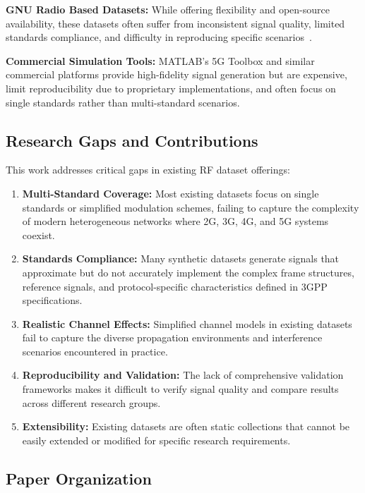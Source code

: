 \documentclass[conference]{IEEEtran}
\begin{document}
\textbf{GNU Radio Based Datasets:} While offering flexibility and open-source availability, these datasets often suffer from inconsistent signal quality, limited standards compliance, and difficulty in reproducing specific scenarios~\cite{blossom2004gnu}.

\textbf{Commercial Simulation Tools:} MATLAB's 5G Toolbox and similar commercial platforms provide high-fidelity signal generation but are expensive, limit reproducibility due to proprietary implementations, and often focus on single standards rather than multi-standard scenarios.

\subsection{Research Gaps and Contributions}

This work addresses critical gaps in existing RF dataset offerings:

\begin{enumerate}
\item \textbf{Multi-Standard Coverage:} Most existing datasets focus on single standards or simplified modulation schemes, failing to capture the complexity of modern heterogeneous networks where 2G, 3G, 4G, and 5G systems coexist.

\item \textbf{Standards Compliance:} Many synthetic datasets generate signals that approximate but do not accurately implement the complex frame structures, reference signals, and protocol-specific characteristics defined in 3GPP specifications.

\item \textbf{Realistic Channel Effects:} Simplified channel models in existing datasets fail to capture the diverse propagation environments and interference scenarios encountered in practice.

\item \textbf{Reproducibility and Validation:} The lack of comprehensive validation frameworks makes it difficult to verify signal quality and compare results across different research groups.

\item \textbf{Extensibility:} Existing datasets are often static collections that cannot be easily extended or modified for specific research requirements.
\end{enumerate}

\subsection{Paper Organization}
\end{document}
